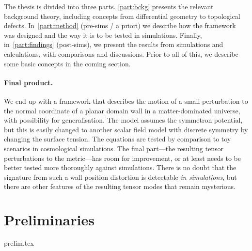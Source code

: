 










The thesis is divided into three parts. %
\cref{part:bckg} presents the relevant background theory, including concepts from differential geometry to topological defects. %
In~\cref{part:method} (pre-sims / a priori) we describe how the framework was designed and the way it is to be tested in simulations. %
Finally, in~\cref{part:findings} (post-sims), we present the results from simulations and calculations, with comparisons and discussions. %
Prior to all of this, we describe some basic concepts in the coming section.


\begin{draft}
    \paragraph{Final product.} %
    We end up with a framework that describes the motion of a small perturbation to the normal coordinate of a planar domain wall in a matter-dominated universe, with possibility for generalisation. The model assumes the symmetron potential, but this is easily changed to another scalar field model with discrete symmetry by changing the surface tension. The equations are tested by comparison to toy scenarios in cosmological simulations. 
    The final part---the resulting tensor perturbations to the metric---has room for improvement, or at least needs to be better tested more thoroughly against simulations. There is no doubt that the signature from such a wall position distortion is detectable \emph{in simulations}, but there are other features of the resulting tensor modes that remain mysterious. 
\end{draft}




\section{Preliminaries}\label{sec:intro:prelim}%
    {{prelim.tex}}



